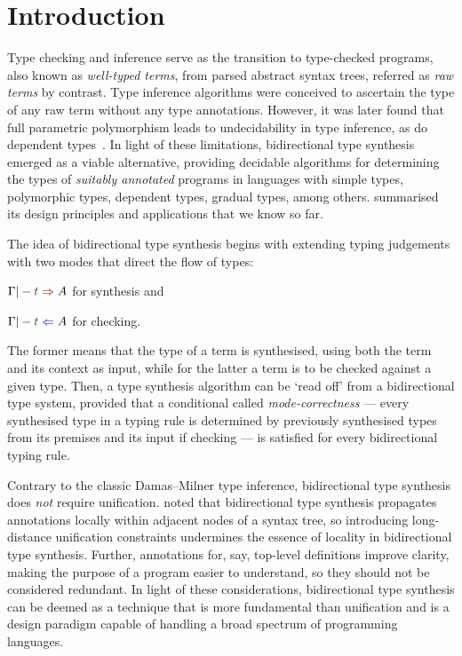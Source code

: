
\section{Introduction}\label{sec:intro}

Type checking and inference serve as the transition to type-checked programs, also known as \emph{well-typed terms}, from parsed abstract syntax trees, referred as \emph{raw terms} by contrast.
Type inference algorithms were conceived to ascertain the type of any raw term without any type annotations.
However, it was later found that full parametric polymorphism leads to undecidability in type inference, as do dependent types~\citep{Wells1999,Dowek1993}.
In light of these limitations, bidirectional type synthesis emerged as a viable alternative, providing decidable algorithms for determining the types of \emph{suitably annotated} programs in languages with simple types, polymorphic types, dependent types, gradual types, among others. 
\citet{Dunfield2021} summarised its design principles and applications that we know so far. 

The idea of bidirectional type synthesis begins with extending typing judgements with two modes that direct the flow of types:
\begin{enumerate*}
  \item $\Gamma |- \isTerm{t} \syn A$ for synthesis and 
  \item $\Gamma |- \isTerm{t} \chk A$ for checking.
\end{enumerate*}
The former means that the type of a term is synthesised, using both the term and its context as input, while for the latter a term is to be checked against a given type.
Then, a type synthesis algorithm can be `read off' from a bidirectional type system, provided that a conditional called \emph{mode-correctness} --- every synthesised type in a typing rule is determined by previously synthesised types from its premises and its input if checking --- is satisfied for every bidirectional typing rule.


Contrary to the classic Damas--Milner type inference, bidirectional type synthesis does \emph{not} require unification.
\citet{Pierce2000} noted that bidirectional type synthesis propagates annotations locally within adjacent nodes of a syntax tree, so introducing long-distance unification constraints undermines the essence of locality in bidirectional type synthesis.
Further, annotations for, say, top-level definitions improve clarity, making the purpose of a program easier to understand, so they should not be considered redundant.
In light of these considerations, bidirectional type synthesis can be deemed as a technique that is more fundamental than unification and is a design paradigm capable of handling a broad spectrum of programming languages.

